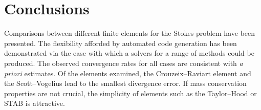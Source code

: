 \section{Conclusions}

Comparisons between different finite elements for the Stokes problem have
been presented. The flexibility afforded by automated code generation
has been demonstrated via the ease with which a solvers for a range
of methods could be produced.
The observed convergence rates for all cases are consistent with \emph{a
priori} estimates.  Of the elements examined, the Crouzeix--Raviart
element and the Scott--Vogelius lead to the smallest divergence error.
If mass conservation properties are not crucial, the simplicity of
elements such as the Taylor--Hood or STAB is attractive.
